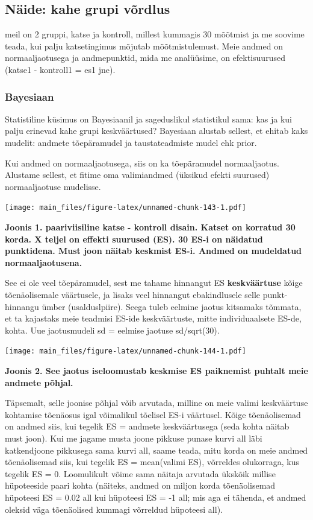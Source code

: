 \documentclass[]{book}
\begin{document}
\subsection{Näide: kahe grupi võrdlus}\label{naide-kahe-grupi-vordlus}

meil on 2 gruppi, katse ja kontroll, millest kummagis 30 mõõtmist ja me
soovime teada, kui palju katsetingimus mõjutab mõõtmistulemust. Meie
andmed on normaaljaotusega ja andmepunktid, mida me analüüsime, on
efektisuurused (katse1 - kontroll1 = es1 jne).

\subsubsection{Bayesiaan}\label{bayesiaan}

Statistiline küsimus on Bayesiaanil ja sageduslikul statistikul sama:
kas ja kui palju erinevad kahe grupi keskväärtused? Bayesiaan alustab
sellest, et ehitab kaks mudelit: andmete tõepäramudel ja taustateadmiste
mudel ehk prior.

Kui andmed on normaaljaotusega, siis on ka tõepäramudel normaaljaotus.
Alustame sellest, et fitime oma valimiandmed (üksikud efekti suurused)
normaaljaotuse mudelisse.

\texttt{[image: main\_files/figure-latex/unnamed-chunk-143-1.pdf]}

\textbf{Joonis 1. paariviisiline katse - kontroll disain. Katset on
korratud 30 korda. X teljel on effekti suurused (ES). 30 ES-i on
näidatud punktidena. Must joon näitab keskmist ES-i. Andmed on
mudeldatud normaaljaotusena.}

See ei ole veel tõepäramudel, sest me tahame hinnangut ES
\textbf{keskväärtuse} kõige tõenäolisemale väärtusele, ja lisaks veel
hinnangut ebakindlusele selle punkt-hinnangu ümber (usalduslpiire).
Seega tuleb eelmine jaotus kitsamaks tõmmata, et ta kajastaks meie
teadmisi ES-ide keskväärtuste, mitte individuaalsete ES-de, kohta. Uue
jaotusmudeli sd = eelmise jaotuse sd/sqrt(30).

\texttt{[image: main\_files/figure-latex/unnamed-chunk-144-1.pdf]}

\textbf{Joonis 2. See jaotus iseloomustab keskmise ES paiknemist puhtalt
meie andmete põhjal.}

Täpsemalt, selle joonise põhjal võib arvutada, milline on meie valimi
keskväärtuse kohtamise tõenäosus igal võimalikul tõelisel ES-i
väärtusel. Kõige tõenäolisemad on andmed siis, kui tegelik ES = andmete
keskväärtusega (seda kohta näitab must joon). Kui me jagame musta joone
pikkuse punase kurvi all läbi katkendjoone pikkusega sama kurvi all,
saame teada, mitu korda on meie andmed tõenäolisemad siis, kui tegelik
ES = mean(valimi ES), võrreldes olukorraga, kus tegelik ES = 0.
Loomulikult võime sama näitaja arvutada ükskõik millise hüpoteeside
paari kohta (näiteks, andmed on miljon korda tõenäolisemad hüpoteesi ES
= 0.02 all kui hüpoteesi ES = -1 all; mis aga ei tähenda, et andmed
oleksid väga tõenäolised kummagi võrreldud hüpoteesi all).
\end{document}
